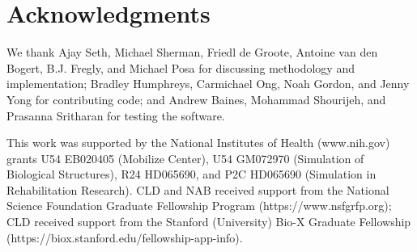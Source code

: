 \documentclass[10pt,letterpaper]{article}
\begin{document}
\section*{Acknowledgments}

We thank Ajay Seth, Michael Sherman, Friedl de Groote, Antoine van den Bogert, B.J. Fregly, and Michael Posa for discussing methodology and implementation; Bradley Humphreys, Carmichael Ong, Noah Gordon, and Jenny Yong for contributing code; and Andrew Baines, Mohammad Shourijeh, and Prasanna Sritharan for testing the software.

This work was supported by the National Institutes of Health (www.nih.gov) grants U54 EB020405 (Mobilize Center), U54 GM072970 (Simulation of Biological Structures), R24 HD065690, and P2C HD065690 (Simulation in Rehabilitation Research). CLD and NAB received support from the National Science Foundation Graduate Fellowship Program (https://www.nsfgrfp.org); CLD received support from the Stanford (University) Bio-X Graduate Fellowship (https://biox.stanford.edu/fellowship-app-info).

\nolinenumbers

%
%
%



%
%
%
%
\end{document}
